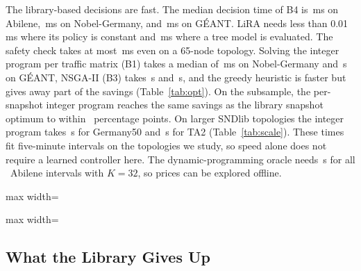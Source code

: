 \documentclass[preprint,12pt]{elsarticle}
\begin{document}
The library-based decisions are fast. The median decision time of B4 is \abiLatBFour\,ms on Abilene, \nobLatBFour\,ms on Nobel-Germany, and \geaLatBFour\,ms on G\'{E}ANT. LiRA needs less than 0.01\,ms where its policy is constant and \geaLatLiRA\,ms where a tree model is evaluated. The safety check takes at most \safetyTA\,ms even on a 65-node topology. Solving the integer program per traffic matrix (B1) takes a median of \nobIlpMs\,ms on Nobel-Germany and \geaIlpS\,s on G\'{E}ANT, NSGA-II (B3) takes \nobGaS\,s and \geaGaS\,s, and the greedy heuristic is faster but gives away part of the savings (Table~\ref{tab:opt}). On the subsample, the per-snapshot integer program reaches the same savings as the library snapshot optimum to within \boneGapPP\ percentage points. On larger SNDlib topologies the integer program takes \ilpGermany\,s for Germany50 and \ilpTA\,s for TA2 (Table~\ref{tab:scale}). These times fit five-minute intervals on the topologies we study, so speed alone does not require a learned controller here. The dynamic-programming oracle needs \dpRunAbi\,s for all \abiIntervals\ Abilene intervals with $K=32$, so prices can be explored offline.

\begin{table}[t]
\centering
\caption{Per-Snapshot Optimization Baselines on a Test Subsample}
\label{tab:opt}
\footnotesize
\setlength{\tabcolsep}{4pt}
\begin{adjustbox}{max width=\textwidth}\end{adjustbox}
\end{table}

\begin{table}[t]
\centering
\caption{Scalability of the Optimization Step and the Safety Check}
\label{tab:scale}
\footnotesize
\setlength{\tabcolsep}{2pt}
\begin{adjustbox}{max width=\textwidth}\end{adjustbox}
\end{table}

\subsection{What the Library Gives Up}\label{sec:res-bound}
\end{document}
